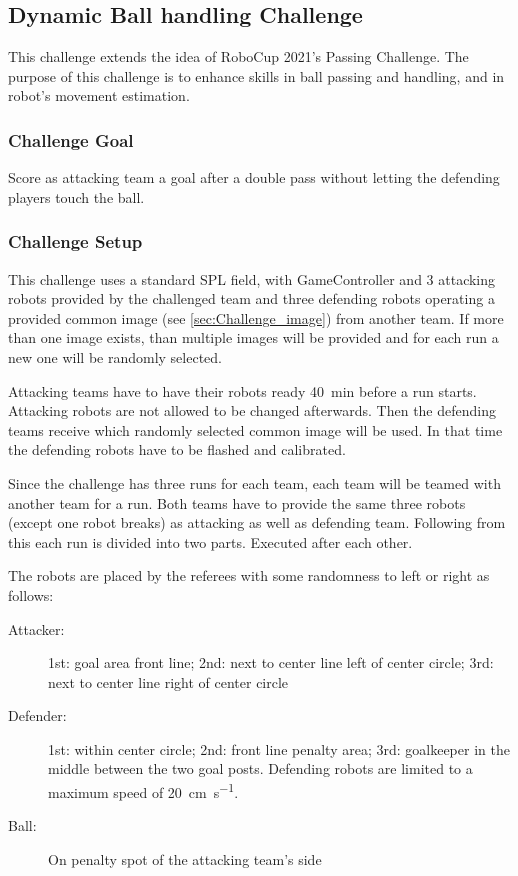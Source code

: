 \subsection{Dynamic Ball handling Challenge}

    This challenge extends the idea of RoboCup 2021's Passing Challenge. The purpose of this challenge is to enhance skills in ball passing and handling, and in robot's movement estimation.

    \subsubsection{Challenge Goal}

        Score as attacking team a goal after a double pass without letting the defending players touch the ball.

    \subsubsection{Challenge Setup}

        This challenge uses a standard SPL field, with GameController and 3 attacking robots provided by the challenged team and three defending robots operating a provided common image (see \cref{sec:Challenge_image}) from another team. If more than one image exists, than multiple images will be provided and for each run a new one will be randomly selected.

        Attacking teams have to have their robots ready \qty{40}{\minute} before a run starts. Attacking robots are not allowed to be changed afterwards. Then the defending teams receive which randomly selected common image will be used. In that time the defending robots have to be flashed and calibrated.

        Since the challenge has three runs for each team, each team will be teamed with another team for a run. Both teams have to provide the same three robots (except one robot breaks) as attacking as well as defending team. Following from this each run is divided into two parts. Executed after each other.

        The robots are placed by the referees with some randomness to left or right as follows:

        \begin{description}
            \item[Attacker:] 1st: goal area front line; 2nd: next to center line left of center circle; 3rd: next to center line right of center circle
            \item[Defender:] 1st: within center circle; 2nd: front line penalty area; 3rd: goalkeeper in the middle between the two goal posts. Defending robots are limited to a maximum speed of \qty{20}{\cm \per \second}.
            \item[Ball:] On penalty spot of the attacking team's side
        \end{description}

